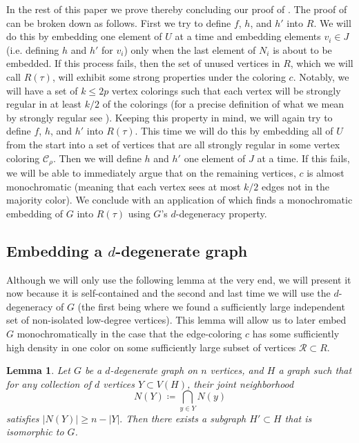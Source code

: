 \documentclass{article}
\newcommand{\cC}{\mathcal{C} }
\newcommand{\cR}{\mathcal{R} }
\newtheorem{lemma}[theorem]{Lemma}
\theoremstyle{definition}
\begin{document}
In the rest of this paper we prove  thereby concluding our proof of . The proof of  can be broken down as follows. First we try to define $f$, $h$, and $h'$ into $R$. We will do this by embedding one element of $U$ at a time and embedding elements $v_i\in J$ (i.e. defining $h$ and $h'$ for $v_i$) only when the last element of $N_i$ is about to be embedded. If this process fails, then the set of unused vertices in $R$, which we will call $R(\tau)$, will exhibit some strong properties under the coloring $c$. Notably, we will have a set of $k\leq 2p$ vertex colorings such that each vertex will be strongly regular in at least $k/2$ of the colorings (for a precise definition of what we mean by strongly regular see ). Keeping this property in mind, we will again try to define $f$, $h$, and $h'$ into $R(\tau)$. This time we will do this by embedding all of $U$ from the start into a set of vertices that are all strongly regular in some vertex coloring $\cC_\rho$. Then we will define $h$ and $h'$ one element of $J$ at a time. If this fails, we will be able to immediately argue that on the remaining vertices, $c$ is almost monochromatic (meaning that each vertex sees at most $k/2$ edges not in the majority color).
We conclude with an application of  which finds a monochromatic embedding of $G$ into $R(\tau)$ using $G$'s $d$-degeneracy property. 

\subsection{Embedding a $d$-degenerate graph}\label{sec:d-d}

Although we will only use the following lemma at the very end, we will present it now because it is self-contained and the second and last time we will use the $d$-degeneracy of $G$ (the first being  where we found a sufficiently large independent set of non-isolated low-degree vertices). This lemma will allow us to later embed $G$ monochromatically in the case that the edge-coloring $c$ has some sufficiently high density in one color on some sufficiently large subset of vertices $\cR\subset R$.

\begin{lemma}\label{lem:mono}
    Let $G$ be a $d$-degenerate graph on $n$ vertices, and $H$ a graph such that for any collection of $d$ vertices $Y\subset V(H)$, their joint neighborhood $$N(Y)\coloneqq \bigcap_{y\in Y} N(y)$$ satisfies 
    $|N(Y)|\geq n-|Y|.$ Then there exists a subgraph $H'\subset H$ that is isomorphic to $G$.
\end{lemma}
\end{document}
